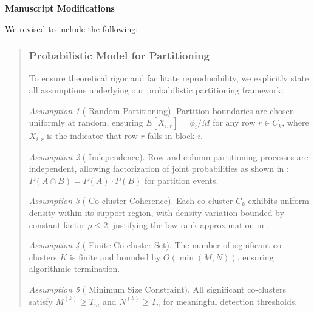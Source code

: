 \documentclass{ar2rc}
\theoremstyle{definition}
\theoremstyle{remark} %
\newtheorem*{assumption*}{Assumption}
\begin{document}
\textbf{Manuscript Modifications}

We revised  to include the following:

\begin{quote}
  \subsubsection*{ Probabilistic Model for Partitioning}

  To ensure theoretical rigor and facilitate reproducibility, we explicitly state all assumptions underlying our probabilistic partitioning framework:

  \begin{assumption*}[ Random Partitioning]
    Partition boundaries are chosen uniformly at random, ensuring $E[X_{i,r}] = \phi_i/M$ for any row $r \in C_k$, where $X_{i,r}$ is the indicator that row $r$ falls in block $i$.
  \end{assumption*}

  \begin{assumption*}[ Independence]
    Row and column partitioning processes are independent, allowing factorization of joint probabilities as shown in : $P(A \cap B) = P(A) \cdot P(B)$ for partition events.
  \end{assumption*}

  \begin{assumption*}[ Co-cluster Coherence]
    Each co-cluster $C_k$ exhibits uniform density within its support region, with density variation bounded by constant factor $\rho \leq 2$, justifying the low-rank approximation in .
  \end{assumption*}

  \begin{assumption*}[ Finite Co-cluster Set]
    The number of significant co-clusters $K$ is finite and bounded by $O(\min(M,N))$, ensuring algorithmic termination.
  \end{assumption*}

  \begin{assumption*}[ Minimum Size Constraint]
    All significant co-clusters satisfy $M^{(k)} \geq T_m$ and $N^{(k)} \geq T_n$ for meaningful detection thresholds.
  \end{assumption*}


\end{quote}
\end{document}
